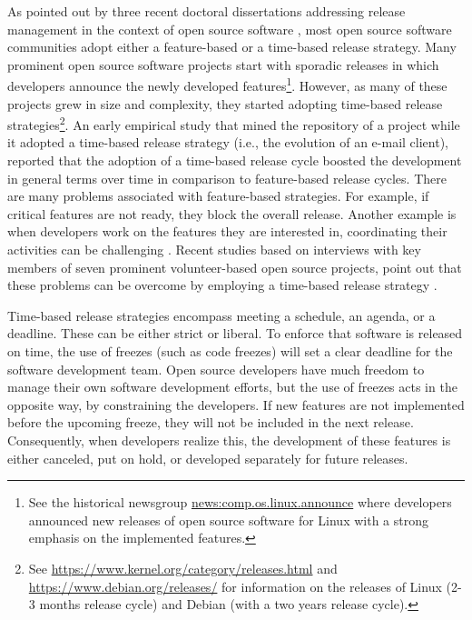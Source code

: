 \documentclass[dvipsnames]{interact}
\theoremstyle{plain}\newtheorem{theorem}{Theorem}[section]
\theoremstyle{definition}
\theoremstyle{remark}
\begin{document}
As pointed out by three recent doctoral dissertations addressing release management in the context of open source software  \citep{Michlmayr2007,Wright2012,PooCaamano2016}, 
most open source software communities adopt either a feature-based or a time-based release strategy. Many prominent open source software projects start with sporadic releases in which developers announce the newly developed features\footnote{See the historical newsgroup \url{news:comp.os.linux.announce} where developers announced new releases of open source software for Linux with a strong emphasis on the implemented features.}. However, as many of these projects grew in size and complexity, they started adopting time-based release strategies\footnote{See  \url{https://www.kernel.org/category/releases.html}  and 
\url{https://www.debian.org/releases/} for information on the releases of Linux (2-3 months release cycle) and Debian (with a two years release cycle).}. 
An early empirical study \citep{MartinezRomoRobles_et_al2008} that mined the repository of a project while it adopted a time-based release strategy (i.e., the evolution of an e-mail client),  reported that the adoption of a time-based release cycle boosted the development in general terms over time in comparison to feature-based release cycles. 
There are many problems associated with feature-based strategies. For example, if critical features are not ready, they block the overall release.  Another example is when developers work on the features they are interested in, coordinating their activities can be challenging \citep{Michlmayr2007}.
Recent studies based on interviews with key members of seven prominent volunteer-based open source projects, point out that these problems can be overcome by employing a time-based release strategy \citep{MichlmayrFitzgerald2012,MichlmayrFitzgerald_et_al2015}. 

Time-based release strategies encompass meeting a schedule, an agenda, or a deadline. These can be either strict or liberal.  To enforce that software is released on time, the use of freezes (such as code freezes) will set a clear deadline for the software development team.  Open source developers have much freedom to manage their own software development efforts, but the use of freezes acts in the opposite way, by constraining the developers. If new features are not implemented before the upcoming freeze, they will not be included in the next release. Consequently, when developers realize this, the development of these features is either canceled, put on hold, or developed separately for future releases.
\end{document}
